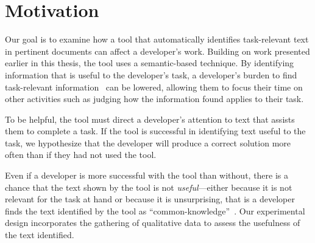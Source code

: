 


\section{Motivation}
\label{cp6:method}



Our goal is to examine how a tool that 
automatically identifies
task-relevant text in pertinent
documents can affect a developer's work.
Building on work presented earlier in this
thesis, the tool  uses a semantic-based technique.
By identifying information that is useful to the developer's task,
a developer's burden to find task-relevant information~\cite{Robillard2015}
can be lowered,
allowing them to focus their time on other activities such as judging how the information found applies to their task.


To be helpful, the tool must direct a developer's attention to text that assists them to complete a task.
If the tool is successful in identifying text useful to the task, we hypothesize that
the developer will produce a correct solution more often than if they had not used the tool.





Even if a developer is more successful
with the tool than without, there is a chance that the text shown by the tool is not \textit{useful}---either because it is not relevant for the task at hand or because it is unsurprising, that is
a developer finds the text identified by the tool as ``common-knowledge''~\cite{cwalina2008, Robillard2015}. Our experimental design incorporates the gathering of qualitative data to assess the usefulness of the text identified.

 




